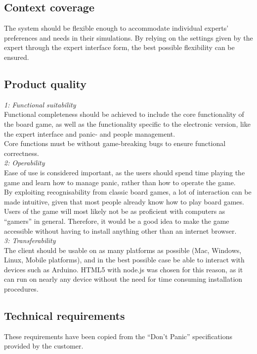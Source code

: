 \subsection{Context coverage}
The system should be flexible enough to accommodate individual experts’ preferences and needs in their simulations. By relying on the settings given by the expert through the expert interface form, the best possible flexibility can be ensured.

\subsection{Product quality}

\emph{1: Functional suitability}\\
Functional completeness should be achieved to include the core functionality 
of the board game, as well as the functionality specific to the electronic 
version, like the expert interface and panic- and people management. 
\\
Core functions must be without game-breaking bugs to ensure functional 
correctness.
\\\newline
\emph{2: Operability}\\
Ease of use is considered important, as the users should spend time playing the 
game and learn how to manage panic, rather than how to operate the game. 
\\
By exploiting recognisability from classic board games, a lot of interaction 
can be made intuitive, given that most people already know how to play board 
games. 
\\
Users of the game will most likely not be as proficient with computers as 
“gamers” in general. Therefore, it would be a good idea to make the game 
accessible without having to install anything other than an internet browser.
\\\newline
\emph{3: Transferability}\\
The client should be usable on as many platforms as possible (Mac, Windows, 
Linux, Mobile platforms), and in the best possible case be able to interact 
with devices such as Arduino. HTML5 with node.js was chosen for this reason, as 
it can run on nearly any device without the need for time consuming 
installation procedures.


\subsection{Technical requirements}
These requirements have been copied from the “Don’t Panic” specifications 
provided by the customer.\\

